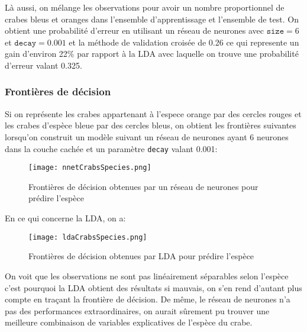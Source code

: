 \documentclass{article}
\begin{document}
\begin{multicols}{2}
Là aussi, on mélange les observations pour avoir un nombre proportionnel de
crabes bleus et oranges dans l'ensemble d'apprentissage et l'ensemble de test.
On obtient une probabilité d'erreur en utilisant un réseau de neurones avec
$\texttt{size} = 6$ et $\texttt{decay} = 0.001$ et la méthode de validation
croisée de 0.26 ce qui represente un gain d'environ 22\% par rapport à la LDA
avec laquelle on trouve une probabilité d'erreur valant 0.325.

\subsubsection{Frontières de décision}\label{subsubsec:ex262}

Si on représente les crabes appartenant à l'espece orange par des cercles rouges
et les crabes d'espèce bleue par des cercles bleus, on obtient les frontières
suivantes lorsqu'on construit un modèle suivant un réseau de neurones ayant
6 neurones dans la couche cachée et un paramètre \texttt{decay} valant 0.001:

\begin{figure}[H]
    \begin{center}
        \texttt{[image: nnetCrabsSpecies.png]}
        \centering
        \captionsetup{justification=centering}
        \caption{\label{fig:nnetSpecies}Frontières de décision obtenues par un réseau de neurones pour prédire l'espèce}
    \end{center}
\end{figure}

En ce qui concerne la LDA, on a:

\begin{figure}[H]
    \begin{center}
        \texttt{[image: ldaCrabsSpecies.png]}
        \centering
        \captionsetup{justification=centering}
        \caption{\label{fig:ldaSpecies}Frontières de décision obtenues par LDA pour prédire l'espèce}
    \end{center}
\end{figure}

On voit que les observations ne sont pas linéairement séparables selon l'espèce
c'est pourquoi la LDA obtient des résultats si mauvais, on s'en rend d'autant
plus compte en traçant la frontière de décision. De même, le réseau de neurones
n'a pas des performances extraordinaires, on aurait sûrement pu trouver une
meilleure combinaison de variables explicatives de l'espèce du crabe.


\end{multicols}
\end{document}
